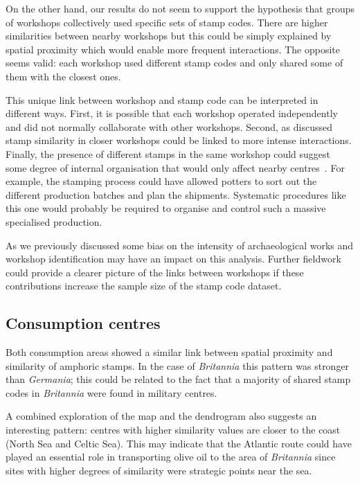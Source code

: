 On the other hand, our results do not seem to support the hypothesis that groups of workshops collectively used specific sets of stamp codes. There are higher similarities between nearby workshops but this could be simply explained by spatial proximity which would enable more frequent interactions. The opposite seems valid: each workshop used different stamp codes and only shared some of them with the closest ones. 

This unique link between workshop and stamp code can be interpreted in different ways. First, it is possible that each workshop operated independently and did not normally collaborate with other workshops. Second, as discussed stamp similarity in closer workshops could be linked to more intense interactions. Finally, the presence of different stamps in the same workshop could suggest some degree of internal organisation that would only affect nearby centres~\citep[104]{juanmorostesis}. For example, the stamping process could have allowed potters to sort out the different production batches and plan the shipments. Systematic procedures like this one would probably be required to organise and control such a massive specialised production.

As we previously discussed some bias on the intensity of archaeological works and workshop identification may have an impact on this analysis. Further fieldwork could provide a clearer picture of the links between workshops if these contributions increase the sample size of the stamp code dataset. 

\subsection{Consumption centres}
\label{sec:7}

Both consumption areas showed a similar link between spatial proximity and similarity of amphoric stamps. In the case of  \textit{Britannia} this pattern was stronger than \textit{Germania}; this could be related to the fact that a majority of shared stamp codes in \textit{Britannia} were found in military centres.  

A combined exploration of the map and the dendrogram also suggests an interesting pattern: centres with higher similarity values are closer to the coast (North Sea and Celtic Sea). This may indicate that the Atlantic route could have played an essential role in transporting olive oil to the area of \textit{Britannia} since sites with higher degrees of similarity were strategic points near the sea.

